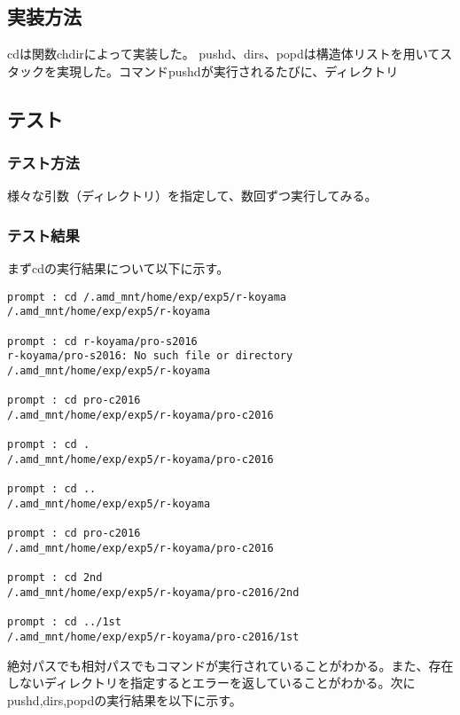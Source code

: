 \documentclass{procreport}
\begin{document}
\subsection{実装方法}
cdは関数chdirによって実装した。
pushd、dirs、popdは構造体リストを用いてスタックを実現した。コマンドpushdが実行されるたびに、ディレクトリ
\subsection{テスト}
\subsubsection{テスト方法}
様々な引数（ディレクトリ）を指定して、数回ずつ実行してみる。
\subsubsection{テスト結果}
まずcdの実行結果について以下に示す。
\begin{screen}
\begin{verbatim}
prompt : cd /.amd_mnt/home/exp/exp5/r-koyama
/.amd_mnt/home/exp/exp5/r-koyama

prompt : cd r-koyama/pro-s2016
r-koyama/pro-s2016: No such file or directory
/.amd_mnt/home/exp/exp5/r-koyama

prompt : cd pro-c2016
/.amd_mnt/home/exp/exp5/r-koyama/pro-c2016

prompt : cd .
/.amd_mnt/home/exp/exp5/r-koyama/pro-c2016

prompt : cd ..
/.amd_mnt/home/exp/exp5/r-koyama

prompt : cd pro-c2016
/.amd_mnt/home/exp/exp5/r-koyama/pro-c2016

prompt : cd 2nd
/.amd_mnt/home/exp/exp5/r-koyama/pro-c2016/2nd

prompt : cd ../1st
/.amd_mnt/home/exp/exp5/r-koyama/pro-c2016/1st
\end{verbatim}
\end{screen}
絶対パスでも相対パスでもコマンドが実行されていることがわかる。また、存在しないディレクトリを指定するとエラーを返していることがわかる。次にpushd,dirs,popdの実行結果を以下に示す。
\end{document}
